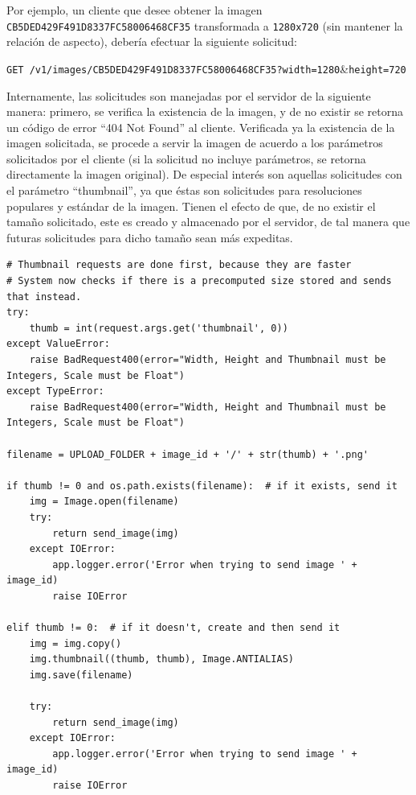 \documentclass[11pt,letterpaper]{article}
\begin{document}
Por ejemplo, un cliente que desee obtener la imagen \texttt{CB5DED429F491D8337FC58006468CF35} transformada a \texttt{1280x720} (sin mantener la relación de aspecto), debería efectuar la siguiente solicitud:
\begin{center}
\texttt{GET /v1/images/CB5DED429F491D8337FC58006468CF35?width=1280}\&\texttt{height=720}
\end{center}


Internamente, las solicitudes son manejadas por el servidor de la siguiente manera:
primero, se verifica la existencia de la imagen, y de no existir se retorna un código de error ``404 Not Found'' al cliente.
Verificada ya la existencia de la imagen solicitada, se procede a servir la imagen de acuerdo a los parámetros solicitados por el cliente (si la solicitud no incluye parámetros, se retorna directamente la imagen original). De especial interés son aquellas solicitudes con el parámetro ``thumbnail'', ya que éstas son solicitudes para resoluciones populares y estándar de la imagen. Tienen el efecto de que, de no existir el tamaño solicitado, este es creado y almacenado por el servidor, de tal manera que futuras solicitudes para dicho tamaño sean más expeditas.\\

\begin{lstlisting}[title=Extracto de código encargado de manejar solicitudes de tamaños precalculados.]
# Thumbnail requests are done first, because they are faster
# System now checks if there is a precomputed size stored and sends that instead.
try:
    thumb = int(request.args.get('thumbnail', 0))
except ValueError:
    raise BadRequest400(error="Width, Height and Thumbnail must be Integers, Scale must be Float")
except TypeError:
    raise BadRequest400(error="Width, Height and Thumbnail must be Integers, Scale must be Float")

filename = UPLOAD_FOLDER + image_id + '/' + str(thumb) + '.png'

if thumb != 0 and os.path.exists(filename):  # if it exists, send it
    img = Image.open(filename)
    try:
        return send_image(img)
    except IOError:
        app.logger.error('Error when trying to send image ' + image_id)
        raise IOError

elif thumb != 0:  # if it doesn't, create and then send it
    img = img.copy()
    img.thumbnail((thumb, thumb), Image.ANTIALIAS)
    img.save(filename)

    try:
        return send_image(img)
    except IOError:
        app.logger.error('Error when trying to send image ' + image_id)
        raise IOError
\end{lstlisting}
\end{document}

